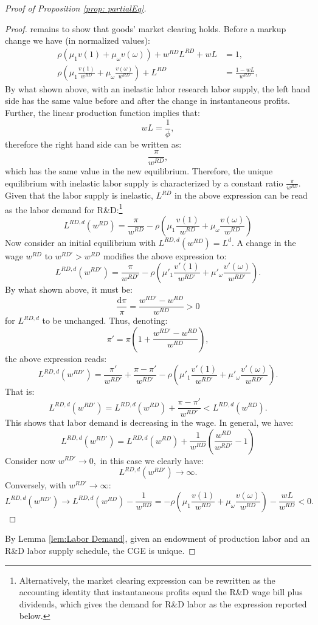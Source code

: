 \begin{proof}[Proof of Proposition \ref{prop: partialEq}]
\begin{proof}
remains to show that goods' market clearing holds. Before a markup
change we have (in normalized values):
\begin{align*}
\rho\left(\mu_{1}v(1)+\mu_{\omega}v(\omega)\right)+w^{RD}L^{RD}+wL & =1,\\
\rho\left(\mu_{1}\frac{v(1)}{w^{RD}}+\mu_{\omega}\frac{v(\omega)}{w^{RD}}\right)+L^{RD} & =\frac{1-wL}{w^{RD}},
\end{align*}
By what shown above, with an inelastic labor research labor supply,
the left hand side has the same value before and after the change
in instantaneous profits. Further, the linear production function
implies that:
\[
wL=\frac{1}{\phi},
\]
therefore the right hand side can be written as:
\[
\frac{\pi}{w^{RD}},
\]
which has the same value in the new equilibrium. Therefore, the unique
equilibrium with inelastic labor supply is characterized by a constant
ratio $\frac{\pi}{w^{RD}}$. Given that the labor supply is inelastic,
$L^{RD}$ in the above expression can be read as the labor demand
for R\&D:\footnote{Alternatively, the market clearing expression can be rewritten as
the accounting identity that instantaneous profits equal the R\&D
wage bill plus dividends, which gives the demand for R\&D labor as
the expression reported below.}
\[
L^{RD,d}\left(w^{RD}\right)=\frac{\pi}{w^{RD}}-\rho\left(\mu_{1}\frac{v(1)}{w^{RD}}+\mu_{\omega}\frac{v(\omega)}{w^{RD}}\right)
\]
Now consider an initial equilibrium with $L^{RD,d}(w^{RD})=L^{d}$.
A change in the wage $w^{RD}$ to $w^{RD\prime}>w^{RD}$ modifies
the above expression to:
\[
L^{RD,d}\left(w^{RD\prime}\right)=\frac{\pi}{w^{RD\prime}}-\rho\left(\mu'_{1}\frac{v'(1)}{w^{RD\prime}}+\mu'_{\omega}\frac{v'(\omega)}{w^{RD\prime}}\right).
\]
By what shown above, it must be:
\[
\frac{\mathrm{d}\pi}{\pi}=\frac{w^{RD\prime}-w^{RD}}{w^{RD}}>0
\]
for $L^{RD,d}$ to be unchanged. Thus, denoting:
\[
\pi'=\pi\left(1+\frac{w^{RD\prime}-w^{RD}}{w^{RD}}\right),
\]
the above expression reads:
\[
L^{RD,d}\left(w^{RD\prime}\right)=\frac{\pi'}{w^{RD\prime}}+\frac{\pi-\pi'}{w^{RD\prime}}-\rho\left(\mu'_{1}\frac{v'(1)}{w^{RD\prime}}+\mu'_{\omega}\frac{v'(\omega)}{w^{RD\prime}}\right).
\]
That is:
\[
L^{RD,d}\left(w^{RD\prime}\right)=L^{RD,d}\left(w^{RD}\right)+\frac{\pi-\pi'}{w^{RD\prime}}<L^{RD,d}\left(w^{RD}\right).
\]
This shows that labor demand is decreasing in the wage. In general,
we have:
\[
L^{RD,d}\left(w^{RD\prime}\right)=L^{RD,d}\left(w^{RD}\right)+\frac{1}{w^{RD}}\left(\frac{w^{RD}}{w^{RD\prime}}-1\right)
\]
Consider now $w^{RD\prime}\rightarrow0,$ in this case we clearly
have:
\[
L^{RD,d}\left(w^{RD\prime}\right)\rightarrow\infty.
\]
Conversely, with $w^{RD\prime}\rightarrow\infty$: 
\[
L^{RD,d}\left(w^{RD\prime}\right)\rightarrow L^{RD,d}\left(w^{RD}\right)-\frac{1}{w^{RD}}=-\rho\left(\mu_{1}\frac{v(1)}{w^{RD}}+\mu_{\omega}\frac{v(\omega)}{w^{RD}}\right)-\frac{wL}{w^{RD}}<0.
\]
\end{proof}
By Lemma \ref{lem:Labor Demand}, given an endowment of production
labor and an R\&D labor supply schedule, the CGE is unique. 


\end{proof}
